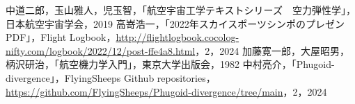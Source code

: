 \documentclass{jarticle}
\begin{document}
\begin{thebibliography}{99}
     中道二郎，玉山雅人，児玉智，「航空宇宙工学テキストシリーズ　空力弾性学」，日本航空宇宙学会，2019
     高嵜浩一，「2022年スカイスポーツシンポのプレゼンPDF」，Flight Logbook，\url{http://flightlogbook.cocolog-nifty.com/logbook/2022/12/post-ffe4a8.html}，2，2024
     加藤寛一郎，大屋昭男，柄沢研治，「航空機力学入門」，東京大学出版会，1982
     中村亮介，「Phugoid-divergence」，FlyingSheeps Github repositories，\url{https://github.com/FlyingSheeps/Phugoid-divergence/tree/main}，2，2024
\end{thebibliography}
\end{document}
